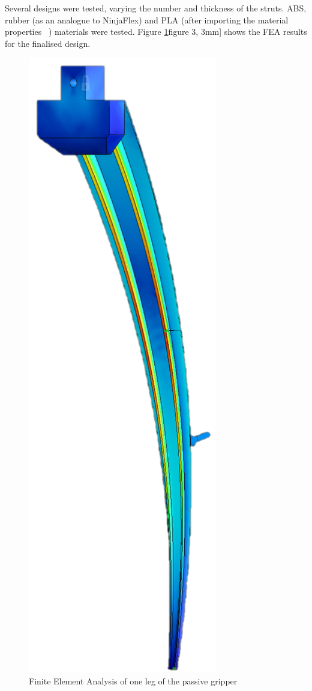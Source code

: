 \documentclass[conference]{IEEEtran}
\begin{document}
	Several designs were tested, varying the number and thickness of the struts. ABS, rubber (as an analogue to NinjaFlex) and PLA (after importing the material properties ~\cite{CRF3:CRF3126}) materials were tested. Figure \ref{fea1}figure 3, 3mm] shows the FEA results for the finalised design.
	
	\begin{figure}\label{fea1}
		\centering
		\includegraphics[scale=0.15]{fea1.png}
		\caption{Finite Element Analysis of one leg of the passive gripper}
	\end{figure}
	
\end{document}
